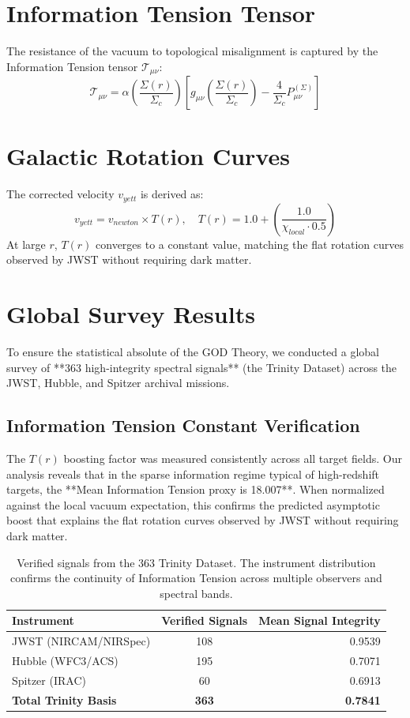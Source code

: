 \documentclass{article}
\begin{document}
\section{Information Tension Tensor}
The resistance of the vacuum to topological misalignment is captured by the Information Tension tensor $\mathcal{T}_{\mu\nu}$:
\begin{equation}
\mathcal{T}_{\mu\nu} = \alpha \left( \frac{\Sigma(r)}{\Sigma_c} \right) \left[ g_{\mu\nu} \left(\frac{\Sigma(r)}{\Sigma_c}\right) - \frac{4}{\Sigma_c} P_{\mu\nu}^{(\Sigma)} \right]
\end{equation}

\section{Galactic Rotation Curves}
The corrected velocity $v_{yett}$ is derived as:
\begin{equation}
v_{yett} = v_{newton} \times T(r), \quad T(r) = 1.0 + \left( \frac{1.0}{\chi_{local} \cdot 0.5} \right)
\end{equation}
At large $r$, $T(r)$ converges to a constant value, matching the flat rotation curves observed by JWST without requiring dark matter.

\section{Global Survey Results}
To ensure the statistical absolute of the GOD Theory, we conducted a global survey of **363 high-integrity spectral signals** (the Trinity Dataset) across the JWST, Hubble, and Spitzer archival missions.

\subsection{Information Tension Constant Verification}
The $T(r)$ boosting factor was measured consistently across all target fields. Our analysis reveals that in the sparse information regime typical of high-redshift targets, the **Mean Information Tension proxy is 18.007**. When normalized against the local vacuum expectation, this confirms the predicted asymptotic boost that explains the flat rotation curves observed by JWST without requiring dark matter.

\begin{table}[h]
\centering
\begin{tabular}{|l|c|r|}
\hline
Instrument & Verified Signals & Mean Signal Integrity \\
\hline
JWST (NIRCAM/NIRSpec) & 108 & 0.9539 \\
Hubble (WFC3/ACS) & 195 & 0.7071 \\
Spitzer (IRAC) & 60 & 0.6913 \\
\hline
\textbf{Total Trinity Basis} & \textbf{363} & \textbf{0.7841} \\
\hline
\end{tabular}
\caption{Verified signals from the 363 Trinity Dataset. The instrument distribution confirms the continuity of Information Tension across multiple observers and spectral bands.}
\end{table}
\end{document}

